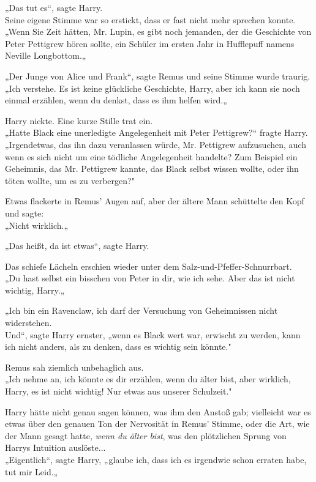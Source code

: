 {„Das tut es“, sagte Harry.\\ Seine eigene Stimme war so erstickt, dass er fast nicht mehr sprechen konnte.\\ „Wenn Sie Zeit hätten, Mr. Lupin, es gibt noch jemanden, der die Geschichte von Peter Pettigrew hören sollte, ein Schüler im ersten Jahr in Hufflepuff namens Neville Longbottom.„

„Der Junge von Alice und Frank“, sagte Remus und seine Stimme wurde traurig.\\ „Ich verstehe. Es ist keine glückliche Geschichte, Harry, aber ich kann sie noch einmal erzählen, wenn du denkst, dass es ihm helfen wird.„

Harry nickte. Eine kurze Stille trat ein.\\ „Hatte Black eine unerledigte Angelegenheit mit Peter Pettigrew?“ fragte Harry.\\ „Irgendetwas, das ihn dazu veranlassen würde, Mr. Pettigrew aufzusuchen, auch wenn es sich nicht um eine tödliche Angelegenheit handelte? Zum Beispiel ein Geheimnis, das Mr. Pettigrew kannte, das Black selbst wissen wollte, oder ihn töten wollte, um es zu verbergen?"

Etwas flackerte in Remus' Augen auf, aber der ältere Mann schüttelte den Kopf und sagte:\\ „Nicht wirklich.„

„Das heißt, da ist etwas“, sagte Harry.

Das schiefe Lächeln erschien wieder unter dem Salz-und-Pfeffer-Schnurrbart.\\ „Du hast selbst ein bisschen von Peter in dir, wie ich sehe. Aber das ist nicht wichtig, Harry.„

„Ich bin ein Ravenclaw, ich darf der Versuchung von Geheimnissen nicht widerstehen.\\ Und“, sagte Harry ernster, „wenn es Black wert war, erwischt zu werden, kann ich nicht anders, als zu denken, dass es wichtig sein könnte."

Remus sah ziemlich unbehaglich aus.\\ „Ich nehme an, ich könnte es dir erzählen, wenn du älter bist, aber wirklich, Harry, es ist nicht wichtig! Nur etwas aus unserer Schulzeit."

Harry hätte nicht genau sagen können, was ihm den Anstoß gab; vielleicht war es etwas über den genauen Ton der Nervosität in Remus' Stimme, oder die Art, wie der Mann gesagt hatte, \emph{wenn du älter bist}, was den plötzlichen Sprung von Harrys Intuition auslöste...\\ „Eigentlich“, sagte Harry, „glaube ich, dass ich es irgendwie schon erraten habe, tut mir Leid.„

}
